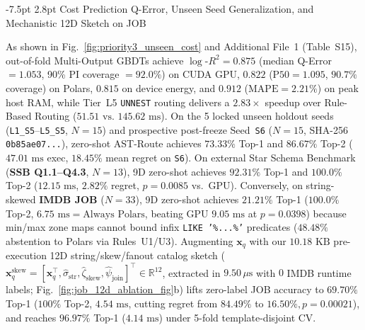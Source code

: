 \documentclass[10pt,a4paper]{article}
\makeatletter
\renewcommand\subsection{\@startsection{subsection}{2}{\z@}%
  {-7.5pt \@plus -2pt \@minus -1pt}%
  {2.8pt \@plus 1pt}%
  {\normalfont\normalsize\bfseries}}
\makeatother
\begin{document}
\subsection{Cost Prediction Q-Error, Unseen Seed Generalization, and Mechanistic 12D Sketch on JOB}

As shown in Fig.~\ref{fig:priority3_unseen_cost} and Additional File~1 (Table~S15), out-of-fold Multi-Output GBDTs achieve $\log\text{-}R^2 = 0.875$ (median Q-Error $=1.053$, 90\% PI coverage $=92.0\%$) on CUDA GPU, $0.822$ ($\text{P50}=1.095$, $90.7\%$ coverage) on Polars, $0.815$ on device energy, and $0.912$ ($\text{MAPE}=2.21\%$) on peak host RAM, while Tier~L5 \texttt{UNNEST} routing delivers a $2.83\times$ speedup over Rule-Based Routing ($51.51\text{ vs.\ }145.62\text{ ms}$). On the 5 locked unseen holdout seeds (\texttt{L1\_S5}--\texttt{L5\_S5}, $N=15$) and prospective post-freeze Seed~\texttt{S6} ($N=15$, SHA-256 \texttt{0b85ae07...}), zero-shot AST-Route achieves $\mathbf{73.33\%}$ Top-1 and $\mathbf{86.67\%}$ Top-2 ($47.01\text{ ms}$ exec, $18.45\%$ mean regret on \texttt{S6}). On external Star Schema Benchmark (\textbf{SSB Q1.1--Q4.3}, $N=13$), 9D zero-shot achieves $\mathbf{92.31\%}$ Top-1 and $\mathbf{100.0\%}$ Top-2 ($12.15\text{ ms}$, $2.82\%$ regret, $p=0.0085$ vs.\ GPU). Conversely, on string-skewed \textbf{IMDB JOB} ($N=33$), 9D zero-shot achieves $21.21\%$ Top-1 ($\mathbf{100.0\%}$ Top-2, $6.75\text{ ms} = \text{Always Polars}$, beating GPU $9.05\text{ ms}$ at $p=0.0398$) because min/max zone maps cannot bound infix \texttt{LIKE '\%...\%'} predicates ($48.48\%$ abstention to Polars via Rules~U1/U3). Augmenting $\mathbf{x}_q$ with our $10.18\text{ KB}$ pre-execution 12D string/skew/fanout catalog sketch ($\mathbf{x}_q^{\text{skew}} = [\mathbf{x}_q^{\top}, \hat{\sigma}_{\text{str}}, \hat{\zeta}_{\text{skew}}, \hat{\psi}_{\text{join}}]^{\top} \in \mathbb{R}^{12}$, extracted in $9.50\,\mu\text{s}$ with $0$ IMDB runtime labels; \label{sec:mechanistic_12d_job_ablation}Fig.~\ref{fig:job_12d_ablation_fig}b) lifts zero-label JOB accuracy to $\mathbf{69.70\%}$ Top-1 ($100\%$ Top-2, $4.54\text{ ms}$, cutting regret from $84.49\%$ to $16.50\%, p=0.00021$), and reaches $\mathbf{96.97\%}$ Top-1 ($4.14\text{ ms}$) under 5-fold template-disjoint CV.
\end{document}
